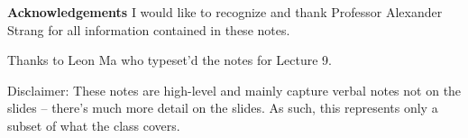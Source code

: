 {\textbf{Acknowledgements}}
I would like to recognize and thank Professor Alexander Strang for all information contained in these notes. 

Thanks to Leon Ma who typeset'd the notes for Lecture 9.

Disclaimer: These notes are high-level and mainly capture verbal notes not on the slides -- there's much more detail on the slides. As such, this represents only a subset of what the class covers.

